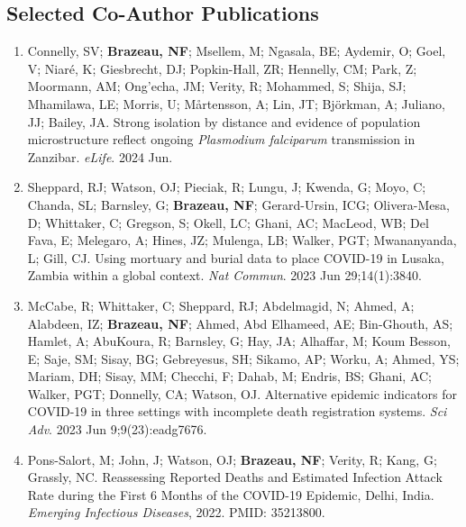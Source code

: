 \documentclass[11pt,letterpaper]{article}
\begin{document}
\vspace{6pt}


\subsection{Selected Co-Author Publications}
\vspace{4pt}

\begin{enumerate}[leftmargin=*, itemsep=4pt, parsep=0pt]

\item Connelly, SV; \textbf{Brazeau, NF}; Msellem, M; Ngasala, BE; Aydemir, O; Goel, V; Niaré, K; Giesbrecht, DJ; Popkin-Hall, ZR; Hennelly, CM; Park, Z; Moormann, AM; Ong'echa, JM; Verity, R; Mohammed, S; Shija, SJ; Mhamilawa, LE; Morris, U; Mårtensson, A; Lin, JT; Björkman, A; Juliano, JJ; Bailey, JA. Strong isolation by distance and evidence of population microstructure reflect ongoing \textit{Plasmodium falciparum} transmission in Zanzibar. \textit{eLife}. 2024 Jun.

\item Sheppard, RJ; Watson, OJ; Pieciak, R; Lungu, J; Kwenda, G; Moyo, C; Chanda, SL; Barnsley, G; \textbf{Brazeau, NF}; Gerard-Ursin, ICG; Olivera-Mesa, D; Whittaker, C; Gregson, S; Okell, LC; Ghani, AC; MacLeod, WB; Del Fava, E; Melegaro, A; Hines, JZ; Mulenga, LB; Walker, PGT; Mwananyanda, L; Gill, CJ. Using mortuary and burial data to place COVID-19 in Lusaka, Zambia within a global context. \textit{Nat Commun}. 2023 Jun 29;14(1):3840.

\item McCabe, R; Whittaker, C; Sheppard, RJ; Abdelmagid, N; Ahmed, A; Alabdeen, IZ; \textbf{Brazeau, NF}; Ahmed, Abd Elhameed, AE; Bin-Ghouth, AS; Hamlet, A; AbuKoura, R; Barnsley, G; Hay, JA; Alhaffar, M; Koum Besson, E; Saje, SM; Sisay, BG; Gebreyesus, SH; Sikamo, AP; Worku, A; Ahmed, YS; Mariam, DH; Sisay, MM; Checchi, F; Dahab, M; Endris, BS; Ghani, AC; Walker, PGT; Donnelly, CA; Watson, OJ. Alternative epidemic indicators for COVID-19 in three settings with incomplete death registration systems. \textit{Sci Adv}. 2023 Jun 9;9(23):eadg7676.

\item Pons-Salort, M; John, J; Watson, OJ; \textbf{Brazeau, NF}; Verity, R; Kang, G; Grassly, NC. Reassessing Reported Deaths and Estimated Infection Attack Rate during the First 6 Months of the COVID-19 Epidemic, Delhi, India. \textit{Emerging Infectious Diseases}, 2022. PMID: 35213800.


\end{enumerate}
\end{document}
